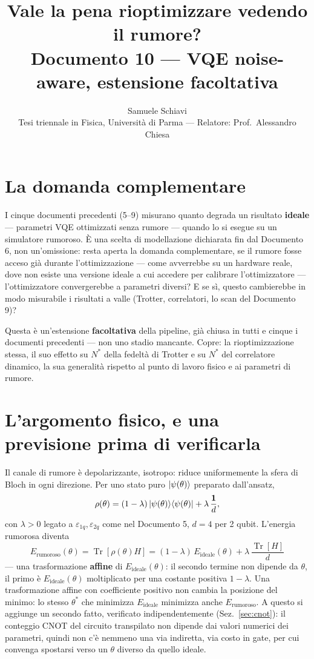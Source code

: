 \documentclass[11pt,a4paper]{article}
\title{\bfseries Vale la pena rioptimizzare vedendo il rumore?\\[2pt]
\large Documento 10 --- VQE noise-aware, estensione facoltativa}
\author{Samuele Schiavi \\ \small Tesi triennale in Fisica, Università di Parma
--- Relatore: Prof.\ Alessandro Chiesa}
\date{}
\newcommand{\Tr}{\operatorname{Tr}}
\begin{document}
\maketitle
\thispagestyle{fancy}

\section{La domanda complementare}

I cinque documenti precedenti (5--9) misurano quanto degrada un risultato
\textbf{ideale} --- parametri VQE ottimizzati senza rumore --- quando lo si
esegue su un simulatore rumoroso. È una scelta di modellazione dichiarata fin
dal Documento 6, non un'omissione: resta aperta la domanda complementare, se
il rumore fosse acceso già durante l'ottimizzazione --- come avverrebbe su un
hardware reale, dove non esiste una versione ideale a cui accedere per
calibrare l'ottimizzatore --- l'ottimizzatore convergerebbe a parametri
diversi? E se sì, questo cambierebbe in modo misurabile i risultati a valle
(Trotter, correlatori, lo scan del Documento 9)?

Questa è un'estensione \textbf{facoltativa} della pipeline, già chiusa in
tutti e cinque i documenti precedenti --- non uno stadio mancante. Copre: la
rioptimizzazione stessa, il suo effetto su $N^*$ della fedeltà di Trotter e su
$N^*$ del correlatore dinamico, la sua generalità rispetto al punto di lavoro
fisico e ai parametri di rumore.

\section{L'argomento fisico, e una previsione prima di verificarla}

Il canale di rumore è depolarizzante, isotropo: riduce uniformemente la sfera
di Bloch in ogni direzione. Per uno stato puro $\lvert \psi(\theta)\rangle$ preparato
dall'ansatz,
\begin{equation}
\rho(\theta) = (1-\lambda)\,\lvert \psi(\theta)\rangle\langle \psi(\theta) \rvert + \lambda\,\frac{\mathbf 1}{d},
\end{equation}
con $\lambda>0$ legato a $\varepsilon_{1q},\varepsilon_{2q}$ come nel
Documento 5, $d=4$ per 2 qubit. L'energia rumorosa diventa
\begin{equation}
E_\text{rumoroso}(\theta) = \Tr[\rho(\theta) H] = (1-\lambda)\,E_\text{ideale}(\theta) + \lambda\,\frac{\Tr[H]}{d}
\end{equation}
--- una trasformazione \textbf{affine} di $E_\text{ideale}(\theta)$: il secondo
termine non dipende da $\theta$, il primo è $E_\text{ideale}(\theta)$
moltiplicato per una costante positiva $1-\lambda$. Una trasformazione affine
con coefficiente positivo non cambia la posizione del minimo: lo stesso
$\theta^*$ che minimizza $E_\text{ideale}$ minimizza anche $E_\text{rumoroso}$.
A questo si aggiunge un secondo fatto, verificato indipendentemente
(Sez.~\ref{sec:cnot}): il conteggio CNOT del circuito transpilato non dipende
dai valori numerici dei parametri, quindi non c'è nemmeno una via indiretta,
via costo in gate, per cui convenga spostarsi verso un $\theta$ diverso da
quello ideale.
\end{document}
